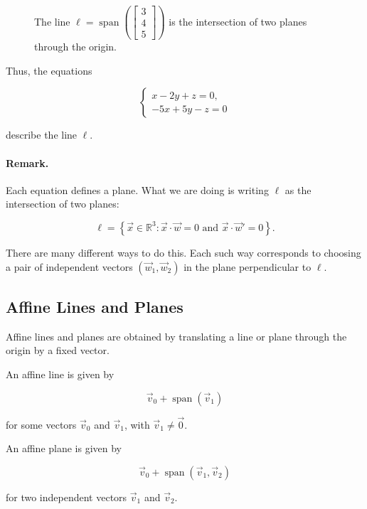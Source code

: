 \begin{figure}[h]
\caption{The line
$\ell=\operatorname{span}\left(\begin{bmatrix}3\\4\\5\end{bmatrix}\right)$
is the intersection of two planes through the origin.}
\end{figure}

Thus, the equations

\[
\begin{cases}
x-2y+z=0,\\
-5x+5y-z=0
\end{cases}
\]

describe the line $\ell$.

\paragraph{Remark.}
Each equation defines a plane. What we are doing is writing $\ell$ as the
intersection of two planes:

\[
\ell
=
\left\{
\vec x\in\mathbb{R}^3:
\vec x\cdot\vec w=0
\text{ and }
\vec x\cdot\vec w'=0
\right\}.
\]

There are many different ways to do this. Each such way corresponds to choosing
a pair of independent vectors $(\vec w_1,\vec w_2)$ in the plane perpendicular
to $\ell$.

\subsection{Affine Lines and Planes}

Affine lines and planes are obtained by translating a line or plane through the
origin by a fixed vector.

An affine line is given by

\[
\vec v_0+\operatorname{span}(\vec v_1)
\]

for some vectors $\vec v_0$ and $\vec v_1$, with $\vec v_1\ne\vec 0$.

An affine plane is given by

\[
\vec v_0+\operatorname{span}(\vec v_1,\vec v_2)
\]

for two independent vectors $\vec v_1$ and $\vec v_2$.

